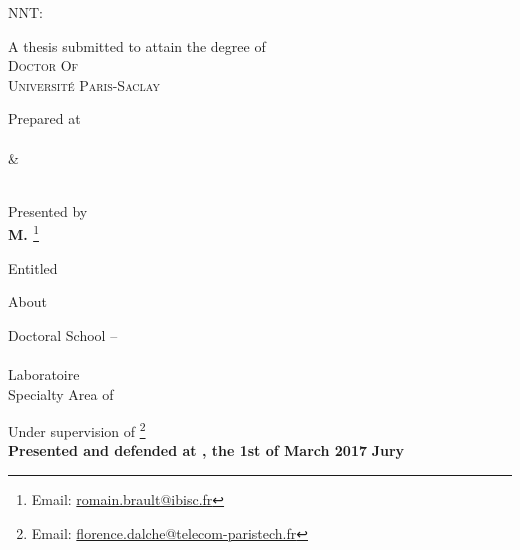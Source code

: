 \begin{titlepage}
\begin{addmargin}[-1cm]{-3cm}
\vspace{2cm}
NNT: \NNT

\vspace{-.5cm}

\begin{center}
\large

\hfill

\begingroup
{A thesis submitted to attain the degree of} \\
{\Huge \color{PSaclay}\textsc{Doctor Of} \\ \textsc{Universit\'e Paris-Saclay}}
\endgroup

\vspace{.5cm}
\begingroup
Prepared at \\
{\Huge \color{PSaclay}\textsc{\myUniUEVE}} \\
{\LARGE \&} \\
{\Huge \color{PSaclay}\textsc{\myUniTP}} \\
\endgroup

\vspace{.5cm}
\begingroup
Presented by \\
{\Large\textbf{M. \textsc{\myName}}}\footnote{Email: \href{mailto:romain.brault@ibisc.fr}{romain.brault@ibisc.fr}} %
\endgroup

\bigskip
\vfill

\begingroup
Entitled \\
\smallskip
{\Huge \color{PSaclay}\textsc{\myTitle}} %
\endgroup

\bigskip
\vfill

\begingroup
About \\
{\Large \textbf{\textsc{\mySubtitle}}} %
\endgroup

\bigskip
\vfill

\begingroup
Doctoral School -- \EDN \\
\myDoctoralSchool \\
Laboratoire \myFaculty \\
Specialty Area of \myDepartment
\medskip

\endgroup
\end{center}
\vspace{1cm}
\vfill

\noindent Under supervision of \mySupervisorDegree \textsc{\mySupervisor}\footnote{Email: \href{mailto:florence.dalche@telecom-paristech.fr}{florence.dalche@telecom-paristech.fr}} \\
\smallskip
\noindent \textbf{Presented and defended at \myUniUEVE, the 1st of March 2017}
\smallskip
\noindent \textbf{Jury}

\end{addmargin}
\end{titlepage}
